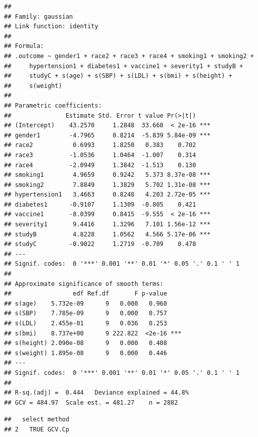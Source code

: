 \documentclass[
]{article}
\newenvironment{Shaded}{\begin{snugshade}}{\end{snugshade}}
\newcommand{\NormalTok}[1]{#1}
\newcommand{\SpecialCharTok}[1]{\textcolor[rgb]{0.00,0.00,0.00}{#1}}
\begin{document}
\begin{verbatim}
## 
## Family: gaussian 
## Link function: identity 
## 
## Formula:
## .outcome ~ gender1 + race2 + race3 + race4 + smoking1 + smoking2 + 
##     hypertension1 + diabetes1 + vaccine1 + severity1 + studyB + 
##     studyC + s(age) + s(SBP) + s(LDL) + s(bmi) + s(height) + 
##     s(weight)
## 
## Parametric coefficients:
##               Estimate Std. Error t value Pr(>|t|)    
## (Intercept)    43.2570     1.2848  33.668  < 2e-16 ***
## gender1        -4.7965     0.8214  -5.839 5.84e-09 ***
## race2           0.6993     1.8250   0.383    0.702    
## race3          -1.0536     1.0464  -1.007    0.314    
## race4          -2.0949     1.3842  -1.513    0.130    
## smoking1        4.9659     0.9242   5.373 8.37e-08 ***
## smoking2        7.8849     1.3829   5.702 1.31e-08 ***
## hypertension1   3.4663     0.8248   4.203 2.72e-05 ***
## diabetes1      -0.9107     1.1309  -0.805    0.421    
## vaccine1       -8.0399     0.8415  -9.555  < 2e-16 ***
## severity1       9.4416     1.3296   7.101 1.56e-12 ***
## studyB          4.8228     1.0562   4.566 5.17e-06 ***
## studyC         -0.9022     1.2719  -0.709    0.478    
## ---
## Signif. codes:  0 '***' 0.001 '**' 0.01 '*' 0.05 '.' 0.1 ' ' 1
## 
## Approximate significance of smooth terms:
##                 edf Ref.df       F p-value    
## s(age)    5.732e-09      9   0.000   0.960    
## s(SBP)    7.785e-09      9   0.000   0.757    
## s(LDL)    2.455e-01      9   0.036   0.253    
## s(bmi)    8.737e+00      9 222.822  <2e-16 ***
## s(height) 2.090e-08      9   0.000   0.408    
## s(weight) 1.895e-08      9   0.000   0.446    
## ---
## Signif. codes:  0 '***' 0.001 '**' 0.01 '*' 0.05 '.' 0.1 ' ' 1
## 
## R-sq.(adj) =  0.444   Deviance explained = 44.8%
## GCV = 484.97  Scale est. = 481.27    n = 2882
\end{verbatim}

\begin{Shaded}
\end{Shaded}

\begin{verbatim}
##   select method
## 2   TRUE GCV.Cp
\end{verbatim}

\begin{Shaded}
\end{Shaded}
\end{document}
